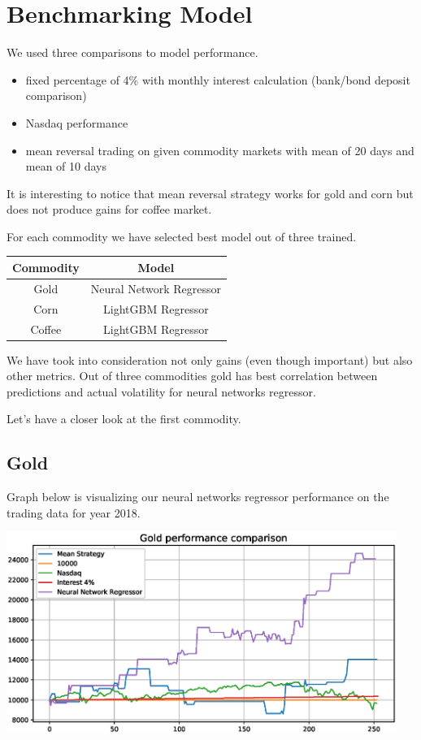 \documentclass[final,2p]{elsarticle}
\begin{document}
\section{Benchmarking Model}

We used three comparisons to model performance.

\begin{itemize}
    \item fixed percentage of 4\% with monthly interest calculation (bank/bond deposit comparison)
    \item Nasdaq performance
    \item mean reversal trading on given commodity markets with mean of 20 days and mean of 10 days
\end{itemize}

It is interesting to notice that mean reversal strategy works for gold and corn but does not produce gains for coffee market.

For each commodity we have selected best model out of three trained.
\begin{center}
    \begin{tabular}{cc}
        Commodity & Model \\
        \hline
        Gold & Neural Network Regressor\\
        Corn & LightGBM Regressor\\
        Coffee & LightGBM Regressor\\
    \end{tabular}
\end{center}

We have took into consideration not only gains (even though important) but also other metrics.
Out of three commodities gold has best correlation between predictions and actual volatility for neural networks regressor.

Let's have a closer look at the first commodity.

\subsection{Gold}

Graph below is visualizing our neural networks regressor performance on the trading data for year 2018.

\begin{center}
\includegraphics[width = 5in]{figures/gold_benchmark_performance.eps}
\end{center}
\end{document}
